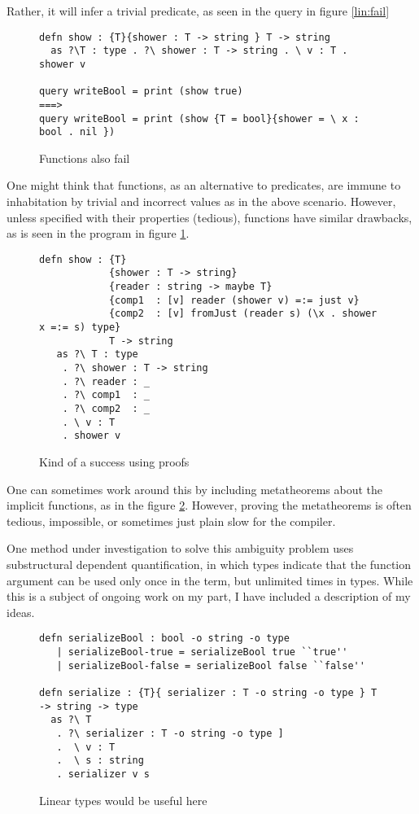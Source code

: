 Rather, it will infer a trivial predicate, as seen in the query in figure \ref{lin:fail}

\begin{figure}[H]
\begin{lstlisting}
defn show : {T}{shower : T -> string } T -> string
  as ?\T : type . ?\ shower : T -> string . \ v : T . shower v 

query writeBool = print (show true)
===>
query writeBool = print (show {T = bool}{shower = \ x : bool . nil })
\end{lstlisting}
\caption{Functions also fail}
\label{lin:ffail}
\end{figure}

One might think that functions, as an alternative to predicates, are immune to inhabitation by trivial and
incorrect values as in the above scenario. However, unless specified with their properties (tedious), 
functions have similar drawbacks, as is seen in the program in figure \ref{lin:ffail}.


\begin{figure}[H]
\begin{lstlisting}
defn show : {T}
            {shower : T -> string}
            {reader : string -> maybe T}
            {comp1  : [v] reader (shower v) =:= just v}
            {comp2  : [v] fromJust (reader s) (\x . shower x =:= s) type}
            T -> string
   as ?\ T : type
    . ?\ shower : T -> string
    . ?\ reader : _
    . ?\ comp1  : _
    . ?\ comp2  : _
    . \ v : T
    . shower v
\end{lstlisting}
\caption{Kind of a success using proofs}
\label{lin:success}
\end{figure}

One can sometimes work around this by including metatheorems about the implicit
functions, as in the figure \ref{lin:success}. However, proving the metatheorems is often tedious,
impossible, or sometimes just plain slow for the compiler.

One method under investigation to solve this ambiguity problem uses substructural dependent
quantification, in which types indicate that the function argument can  be
used only once in the term, but unlimited times in types. While
this is a subject of ongoing work on my part, I have included a description of my ideas.

\begin{figure}[H]
\begin{lstlisting}
defn serializeBool : bool -o string -o type
   | serializeBool-true = serializeBool true ``true''
   | serializeBool-false = serializeBool false ``false''

defn serialize : {T}{ serializer : T -o string -o type } T -> string -> type
  as ?\ T 
   . ?\ serializer : T -o string -o type ]
   .  \ v : T 
   .  \ s : string 
   . serializer v s
\end{lstlisting}
\caption{Linear types would be useful here}
\label{lin:linideal}
\end{figure}

